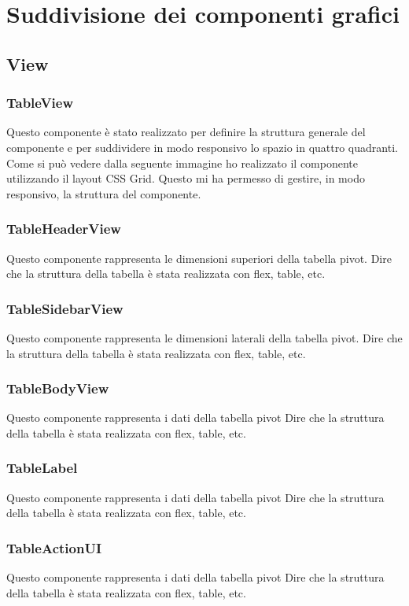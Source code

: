 \section{Suddivisione dei componenti grafici}
\subsection{View}
\subsubsection{TableView}
Questo componente è stato realizzato per definire la struttura generale del componente e per suddividere in modo responsivo lo spazio in quattro quadranti. Come si può vedere dalla seguente immagine ho realizzato il componente utilizzando il layout CSS Grid. Questo mi ha permesso di gestire, in modo responsivo, la struttura del componente.

\subsubsection{TableHeaderView}
Questo componente rappresenta le dimensioni superiori della tabella pivot.
Dire che la struttura della tabella è stata realizzata con flex, table, etc.

\subsubsection{TableSidebarView}
Questo componente rappresenta le dimensioni laterali della tabella pivot.
Dire che la struttura della tabella è stata realizzata con flex, table, etc.

\subsubsection{TableBodyView}
Questo componente rappresenta i dati della tabella pivot
Dire che la struttura della tabella è stata realizzata con flex, table, etc.

\subsubsection{TableLabel}
Questo componente rappresenta i dati della tabella pivot
Dire che la struttura della tabella è stata realizzata con flex, table, etc.

\subsubsection{TableActionUI}
Questo componente rappresenta i dati della tabella pivot
Dire che la struttura della tabella è stata realizzata con flex, table, etc.


